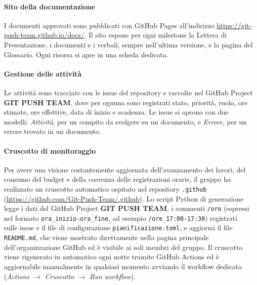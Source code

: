\documentclass[documento]{gpt}
\begin{document}
	\paragraph{Sito della documentazione}
	I documenti approvati sono pubblicati con GitHub Pages all'indirizzo
	\url{https://git-push-team.github.io/docs/}. Il sito espone per ogni
	milestone la Lettera di Presentazione, i documenti e i verbali, sempre
	nell'ultima versione, e la pagina del Glossario. Ogni risorsa si apre in una
	scheda dedicata.
	
	\paragraph{Gestione delle attività}
	Le attività sono tracciate con le issue del repository e raccolte nel
	GitHub Project \textbf{GIT PUSH TEAM}, dove per ognuna sono registrati stato,
	priorità, ruolo, ore stimate, ore effettive, data di inizio e scadenza.
	Le issue si aprono con due modelli: \textit{Attività}, per un compito da
	svolgere su un documento, e \textit{Errore}, per un errore trovato in un
	documento.
	
	\paragraph{Cruscotto di monitoraggio}\label{sec:cruscotto-monitoraggio}
	Per avere una visione costantemente aggiornata dell'avanzamento dei lavori, del
	consumo del budget e della coerenza delle registrazioni orarie, il gruppo ha
	realizzato un cruscotto automatico ospitato nel repository
	\texttt{.github} (\url{https://github.com/Git-Push-Team/.github}). Lo script
	Python di generazione legge i dati del GitHub Project \textbf{GIT PUSH TEAM}, i
	commenti \texttt{/ore} (espressi nel formato \texttt{ora\_inizio-ora\_fine}, ad
	esempio \texttt{/ore 17:00-17:30}) registrati sulle issue e il file di
	configurazione \texttt{pianificazione.toml}, e aggiorna il file
	\texttt{README.md}, che viene mostrato
	direttamente nella pagina principale dell'organizzazione GitHub ed è visibile ai
	soli membri del gruppo. Il cruscotto viene rigenerato in automatico ogni notte
	tramite GitHub Actions ed è aggiornabile manualmente in qualsiasi momento
	avviando il workflow dedicato (\textit{Actions $\rightarrow$ Cruscotto
		$\rightarrow$ Run workflow}).
	
\end{document}
